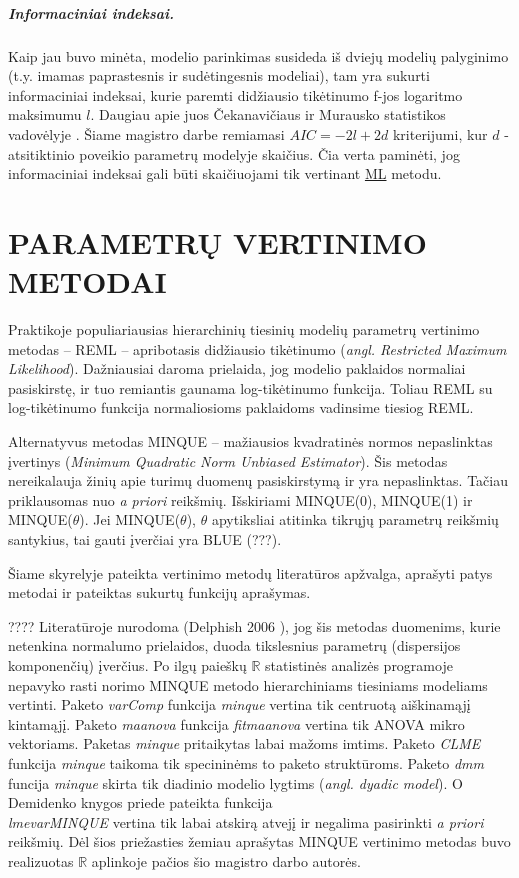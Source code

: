 \documentclass[12pt,a4paper]{article}
\newcommand{\R}{{\mathbb R}}
\begin{document}
\subparagraph{Informaciniai indeksai.} Kaip jau buvo minėta, modelio parinkimas susideda iš dviejų modelių palyginimo (t.y. imamas paprastesnis ir sudėtingesnis modeliai), tam yra sukurti informaciniai indeksai, kurie paremti didžiausio tikėtinumo f-jos logaritmo maksimumu $l$. Daugiau apie juos Čekanavičiaus ir Murausko statistikos vadovėlyje \cite{cek}. Šiame magistro darbe remiamasi $AIC=-2l+2d$ kriterijumi, kur $d$ - atsitiktinio poveikio parametrų modelyje skaičius. Čia verta paminėti, jog informaciniai indeksai gali būti skaičiuojami tik vertinant \hyperlink{reml}{ML} metodu.

\newpage
\section{PARAMETRŲ VERTINIMO METODAI} \label{sec:vert}
\indent Praktikoje populiariausias hierarchinių tiesinių modelių parametrų vertinimo metodas -- REML -- apribotasis didžiausio tikėtinumo (\textit{angl. Restricted Maximum Likelihood}). Dažniausiai daroma prielaida, jog modelio paklaidos normaliai pasiskirstę, ir tuo remiantis gaunama log-tikėtinumo funkcija. Toliau REML su log-tikėtinumo funkcija normaliosioms paklaidoms vadinsime tiesiog REML. 

\indent Alternatyvus metodas MINQUE -- mažiausios kvadratinės normos nepaslinktas įvertinys (\textit{Minimum Quadratic Norm Unbiased Estimator}). Šis metodas nereikalauja žinių apie turimų duomenų pasiskirstymą ir yra nepaslinktas. Tačiau priklausomas nuo \textit{a priori} reikšmių. Išskiriami MINQUE(0), MINQUE(1) ir MINQUE($\theta$). Jei MINQUE($\theta$), $\theta$ apytiksliai atitinka tikrųjų parametrų reikšmių santykius, tai gauti įverčiai yra BLUE (???).

\indent Šiame skyrelyje pateikta vertinimo metodų literatūros apžvalga, aprašyti patys metodai ir pateiktas sukurtų funkcijų aprašymas.


???? Literatūroje nurodoma (Delphish 2006 \cite{delpish}), jog šis metodas duomenims, kurie netenkina normalumo prielaidos, duoda tikslesnius parametrų (dispersijos komponenčių) įverčius. Po ilgų paieškų $\R$ statistinės analizės programoje nepavyko rasti norimo MINQUE metodo hierarchiniams tiesiniams modeliams vertinti. Paketo \textit{varComp} funkcija \textit{minque} vertina tik centruotą aiškinamąjį kintamąjį. Paketo \textit{maanova} funkcija \textit{fitmaanova} vertina tik ANOVA mikro vektoriams. Paketas \textit{minque} pritaikytas labai mažoms imtims. Paketo \textit{CLME} funkcija \textit{minque} taikoma tik specininėms to paketo struktūroms. Paketo \textit{dmm} funcija \textit{minque} skirta  tik diadinio modelio lygtims (\textit{angl. dyadic model}). O Demidenko knygos \cite{mixedR} priede pateikta funkcija\\ \textit{lmevarMINQUE} vertina tik labai atskirą atvejį ir negalima pasirinkti \textit{a priori} reikšmių. Dėl šios priežasties žemiau aprašytas MINQUE vertinimo metodas buvo realizuotas $\R$ aplinkoje pačios šio magistro darbo autorės.
\end{document}
